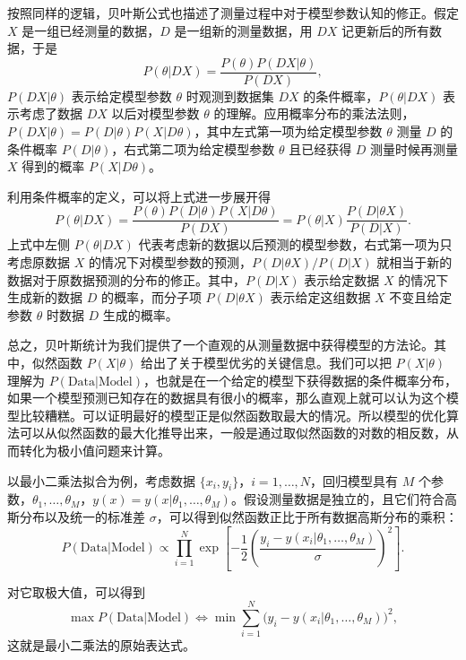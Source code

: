 按照同样的逻辑，贝叶斯公式也描述了测量过程中对于模型参数认知的修正。假定 $X$ 是一组已经测量的数据，$D$ 是一组新的测量数据，用 $DX$ 记更新后的所有数据，于是
\begin{equation}
P(\theta|DX)=\frac{P(\theta)P(DX|\theta)}{P(DX)},
\tag{8.1.4}
\end{equation}
$P(DX|\theta)$ 表示给定模型参数 $\theta$ 时观测到数据集 $DX$ 的条件概率，$P(\theta|DX)$ 表示考虑了数据 $DX$ 以后对模型参数 $\theta$ 的理解。应用概率分布的乘法法则，$P(DX|\theta)=P(D|\theta)P(X|D\theta)$，其中左式第一项为给定模型参数 $\theta$ 测量 $D$ 的条件概率 $P(D|\theta)$，右式第二项为给定模型参数 $\theta$ 且已经获得 $D$ 测量时候再测量 $X$ 得到的概率 $P(X|D\theta)$。

利用条件概率的定义，可以将上式进一步展开得
\begin{equation}
P(\theta|DX)=\frac{P(\theta)P(D|\theta)P(X|D\theta)}{P(DX)}
=P(\theta|X)\frac{P(D|\theta X)}{P(D|X)}.
\tag{8.1.5}
\end{equation}
上式中左侧 $P(\theta|DX)$ 代表考虑新的数据以后预测的模型参数，右式第一项为只考虑原数据 $X$ 的情况下对模型参数的预测，$P(D|\theta X)/P(D|X)$ 就相当于新的数据对于原数据预测的分布的修正。其中，$P(D|X)$ 表示给定数据 $X$ 的情况下生成新的数据 $D$ 的概率，而分子项 $P(D|\theta X)$ 表示给定这组数据 $X$ 不变且给定参数 $\theta$ 时数据 $D$ 生成的概率。

总之，贝叶斯统计为我们提供了一个直观的从测量数据中获得模型的方法论。其中，似然函数 $P(X|\theta)$ 给出了关于模型优劣的关键信息。我们可以把 $P(X|\theta)$ 理解为 $P(\mathrm{Data}|\mathrm{Model})$，也就是在一个给定的模型下获得数据的条件概率分布，如果一个模型预测已知存在的数据具有很小的概率，那么直观上就可以认为这个模型比较糟糕。可以证明最好的模型正是似然函数取最大的情况。所以模型的优化算法可以从似然函数的最大化推导出来，一般是通过取似然函数的对数的相反数，从而转化为极小值问题来计算。

以最小二乘法拟合为例，考虑数据 $\{x_i,y_i\}$，$i=1,\ldots,N$，回归模型具有 $M$ 个参数，$\theta_1,\ldots,\theta_M$，$y(x)=y(x|\theta_1,\ldots,\theta_M)$。假设测量数据是独立的，且它们符合高斯分布以及统一的标准差 $\sigma$，可以得到似然函数正比于所有数据高斯分布的乘积：
\begin{equation}
P(\mathrm{Data}|\mathrm{Model})\propto\prod_{i=1}^{N}\exp\left[-\frac12\left(\frac{y_i-y(x_i|\theta_1,\ldots,\theta_M)}{\sigma}\right)^2\right].
\tag{8.1.6}
\end{equation}

对它取极大值，可以得到
\begin{equation}
\max P(\mathrm{Data}|\mathrm{Model})\Longleftrightarrow
\min\sum_{i=1}^{N}\bigl(y_i-y(x_i|\theta_1,\ldots,\theta_M)\bigr)^2,
\tag{8.1.7}
\end{equation}
这就是最小二乘法的原始表达式。

